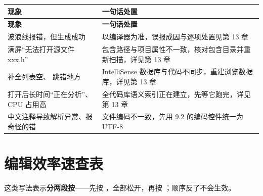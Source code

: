 \begin{longtable}{L{5.4cm}L{9.2cm}}\toprule
\textbf{现象} & \textbf{一句话处置} \\ \midrule \endfirsthead
\toprule \textbf{现象} & \textbf{一句话处置} \\ \midrule \endhead \bottomrule \endlastfoot
波浪线报错，但生成成功 & 以编译器为准，误报成因与逐项处置见第 13 章 \\
满屏“无法打开源文件 xxx.h” & 包含路径与项目属性不一致，核对包含目录并重新扫描，详见第 13 章 \\
补全列表空、 跳错地方 & IntelliSense 数据库与代码不同步，重建浏览数据库，详见第 13 章 \\
打开后长时间“正在分析”、CPU 占用高 & 全代码库语义索引正在建立，先等它跑完，详见第 13 章 \\
中文注释导致解析异常、报奇怪的错 & 文件编码不一致，先用 9.2 的编码控件统一为 UTF-8 \\
\end{longtable}
\section{编辑效率速查表}

\begin{tipbox}[提示]
 这类写法表示\textbf{分两段按}——先按 ，全部松开，再按 ；顺序反了不会生效。
\end{tipbox}

